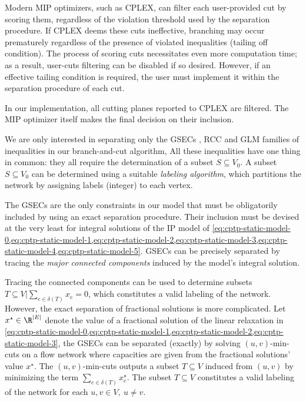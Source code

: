Modern MIP optimizers, such as CPLEX,
can filter each user-provided cut by scoring them,
regardless of the violation threshold used by the separation procedure.
If CPLEX deems these cuts ineffective,
branching may occur prematurely regardless of the presence of violated inequalities (tailing off condition).
The process of scoring cuts necessitates even more computation time;
as a result, user-cuts filtering can be disabled if so desired.
However, if an effective tailing condition is required,
the user must implement it within the separation procedure of each cut.

In our implementation, all cutting planes reported to CPLEX are filtered.
The MIP optimizer itself makes the final decision on their inclusion.

\medskip

We are only interested in separating only the
GSECs ,
RCC 
and GLM 
families of inequalities in our branch-and-cut algorithm,
All these inequalities have one thing in common: they all require
the determination of a subset $S \subseteq V_0$.
A subset $S \subseteq V_0$ can be determined using a suitable \textit{labeling algorithm},
which partitions the network by assigning labels (integer) to each vertex.

The GSECs are the only constraints in our model that must be obligatorily
included by using an exact separation procedure.
Their inclusion must be devised at the very least for integral solutions of the IP model of
\cref{eq:cptp-static-model-0,eq:cptp-static-model-1,eq:cptp-static-model-2,eq:cptp-static-model-3,eq:cptp-static-model-4,eq:cptp-static-model-5}.
GSECs can be precisely separated
by tracing the \textit{major connected components}
induced by the model's integral solution.

Tracing the connected components can be used to determine subsets
$T \subseteq V | \sum_{e \in \delta(T)} x_e = 0$,
which constitutes a valid labeling of the network.
However, the exact separation of fractional solutions is more complicated.
Let $x^\star \in \R^{|E|}$ denote the value of a fractional solution of
the linear relaxation in
\cref{eq:cptp-static-model-0,eq:cptp-static-model-1,eq:cptp-static-model-2,eq:cptp-static-model-3},
the GSECs can be separated (exactly) by solving $(u, v)$-min-cuts
on a flow network where capacities are given from the fractional solutions' value $x^\star$.
The $(u, v)$-min-cuts outputs a subset $T \subseteq V$ induced from $(u, v)$ by
minimizing the term $\sum_{e \in \delta(T)} x^\star_e$.
The subset $T \subseteq V$ constitutes a valid labeling of the network for each $u, v \in V,\ u \ne v$.

